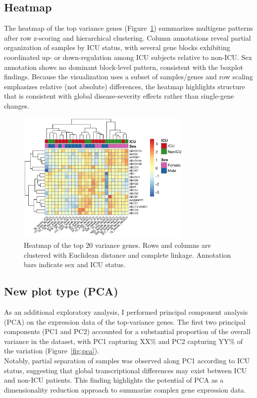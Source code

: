\documentclass[11pt]{article}
\begin{document}
\subsection{Heatmap}
The heatmap of the top variance genes (Figure~\ref{fig:heatmap}) summarizes multigene patterns after row z-scoring and hierarchical clustering. Column annotations reveal partial organization of samples by ICU status, with several gene blocks exhibiting coordinated up- or down-regulation among ICU subjects relative to non-ICU. Sex annotation shows no dominant block-level pattern, consistent with the boxplot findings. Because the visualization uses a subset of samples/genes and row scaling emphasizes relative (not absolute) differences, the heatmap highlights structure that is consistent with global disease-severity effects rather than single-gene changes.
\begin{figure}[H]
\centering
\includegraphics[width=0.75\textwidth]{fig4_heatmap.png}
\caption{Heatmap of the top 20 variance genes. Rows and columns are clustered with Euclidean distance and complete linkage. Annotation bars indicate sex and ICU status.}
\label{fig:heatmap}
\end{figure}

\subsection{New plot type (PCA)}
As an additional exploratory analysis, I performed principal component analysis (PCA) on the expression data of the top-variance genes. 
The first two principal components (PC1 and PC2) accounted for a substantial proportion of the overall variance in the dataset, with PC1 capturing XX\% and PC2 capturing YY\% of the variation (Figure~\ref{fig:pca}). \\
Notably, partial separation of samples was observed along PC1 according to ICU status, suggesting that global transcriptional differences may exist between ICU and non-ICU patients. 
This finding highlights the potential of PCA as a dimensionality reduction approach to summarize complex gene expression data.
\end{document}
